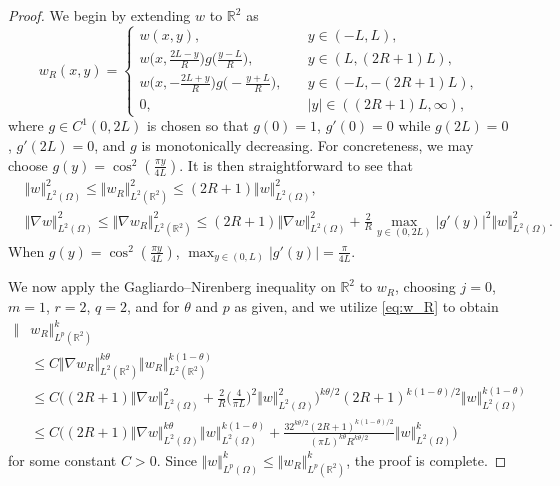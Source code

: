 \documentclass[final,11pt]{article}
\renewcommand{\leq}{\leqslant}
\theoremstyle{definition} %
\newcommand{\LL}{L^2(\mathbb{R}^2)}
\newcommand{\LLO}{L^2(\Omega)}
\newcommand{\lv}{\left\Vert}
\newcommand{\rv}{\right\Vert}
\newcommand{\R}{\mathbb{R}}
\theoremstyle{plain}
\theoremstyle{definition} %
\theoremstyle{remark}
\begin{document}
\begin{proof}
We begin by extending $w$ to $\mathbb{R}^2$ as
\[
w_R(x,y) = \begin{cases}w(x,y),  &y \in (-L,L), \\
w\big(x,\frac{2L-y}{R}\big) g\big(\frac{y-L}{R}\big), &y \in (L,(2R+1)L), \\
w\big(x,-\frac{2L+y}{R}\big) g\big(-\frac{y+L}{R}\big), \quad &y \in (-L,-(2R+1)L), \\
0, &|y|\in((2R+1)L,\infty), \end{cases}
\]
where $g\in C^1(0,2L)$ is chosen so that $g(0)=1$, $g'(0)=0$ while $g(2L)=0$, $g'(2L)=0$, and $g$ is monotonically decreasing. For concreteness, we may choose $g(y) = \cos^2(\frac{\pi y}{4L})$. It is then straightforward to see that
\begin{equation}\label{eq:w_R}
\begin{aligned}
 &\Vert  w \Vert_{\LLO}^2 \leq \Vert w_R \Vert_{\LL}^2  \leq (2R+1) \Vert  w \Vert_{\LLO}^2,\\
 &\Vert \nabla  w \Vert_{\LLO}^2 \leq \Vert \nabla w_R \Vert_{\LL}^2 \leq (2R+1) \Vert \nabla  w\Vert^2_{\LLO} + \frac{2}{R} \max_{y\in(0,2L)}|g'(y)|^2 \Vert w \Vert_{\LLO}^2.
\end{aligned}
\end{equation}
When $g(y) = \cos^2(\frac{\pi y}{4L})$, $\max_{y\in(0,L)}|g'(y)|=\frac{\pi}{4L}$.

We now apply the Gagliardo--Nirenberg inequality on $\R^2$ to $w_R$, choosing $j = 0$, $m = 1$, $r = 2$, $q = 2$, and for $\theta$ and $p$ as given, and we utilize \eqref{eq:w_R} to obtain
\begin{align*}
\Vert & w_R \Vert_{L^p(\R^2)}^k \\
& \leq C \Vert \nabla w_R \Vert_{\LL}^{k\theta} \Vert w_R\Vert_{\LL}^{k(1-\theta)} \\
& \leq  C \Big((2R+1) \Vert \nabla  w\Vert^2_{\LLO} + \frac{2}{R} \Big(\frac{4}{\pi L}\Big)^2 \Vert w \Vert_{\LLO}^2 \Big)^{k\theta/2} (2R+1)^{k(1-\theta)/2} \Vert  w \Vert_{\LLO}^{k(1-\theta)}\\
&\leq C\Big((2R+1)\Vert \nabla  w \Vert_{\LLO}^{k\theta}\lv  w\rv_{\LLO}^{k(1-\theta)} + \frac{32^{k\theta/2}(2R+1)^{k(1-\theta)/2}}{(\pi L)^{k\theta}R^{k\theta/2}} \Vert  w \Vert_{\LLO}^k\Big)
\end{align*}
for some constant $C>0$. Since $\Vert w \Vert_{L^p(\Omega)}^k \leq \Vert w_R \Vert_{L^p(\R^2)}^k $, the proof is complete. 
\end{proof}
\end{document}
